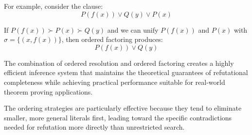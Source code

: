 \noindent For example, consider the clause:
\[P(f(x)) \lor Q(y) \lor P(x)\]

If \(P(f(x)) \succ P(x) \succ Q(y)\) and we can unify \(P(f(x))\) and \(P(x)\) with \(\sigma = \{(x , f(x))\}\), then ordered factoring produces:
\[P(f(x)) \lor Q(y)\]

The combination of ordered resolution and ordered factoring creates a highly efficient inference system that maintains the theoretical guarantees of refutational completeness while achieving practical performance suitable for real-world theorem proving applications.

The ordering strategies are particularly effective because they tend to eliminate smaller, more general literals first, leading toward the specific contradictions needed for refutation more directly than unrestricted search.


